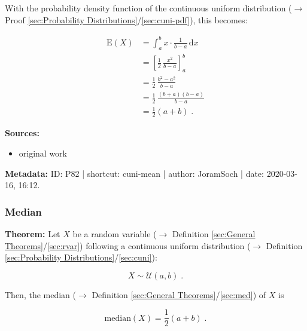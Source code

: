 \documentclass[a4paper,12pt,twoside]{book}
\begin{document}
With the probability density function of the continuous uniform distribution ($\rightarrow$ Proof \ref{sec:Probability Distributions}/\ref{sec:cuni-pdf}), this becomes:

\begin{equation} \label{eq:cuni-mean-cuni-mean-qed}
\begin{split}
\mathrm{E}(X) &= \int_a^b x \cdot \frac{1}{b-a} \, \mathrm{d}x \\
&= \left[ \frac{1}{2} \, \frac{x^2}{b-a} \right]_a^b \\
&= \frac{1}{2} \, \frac{b^2 - a^2}{b-a} \\
&= \frac{1}{2} \, \frac{(b+a)(b-a)}{b-a} \\
&= \frac{1}{2} (a+b) \; .
\end{split}
\end{equation}


\vspace{1em}
\textbf{Sources:}
\begin{itemize}
\item original work\end{itemize}


\vspace{1em}
\textbf{Metadata:} ID: P82 | shortcut: cuni-mean | author: JoramSoch | date: 2020-03-16, 16:12.
\vspace{1em}



\subsubsection[\textbf{Median}]{Median} \label{sec:cuni-med}
\setcounter{equation}{0}

\textbf{Theorem:} Let $X$ be a random variable ($\rightarrow$ Definition \ref{sec:General Theorems}/\ref{sec:rvar}) following a continuous uniform distribution ($\rightarrow$ Definition \ref{sec:Probability Distributions}/\ref{sec:cuni}):

\begin{equation} \label{eq:cuni-med-cuni}
X \sim \mathcal{U}(a, b) \; .
\end{equation}

Then, the median ($\rightarrow$ Definition \ref{sec:General Theorems}/\ref{sec:med}) of $X$ is

\begin{equation} \label{eq:cuni-med-cuni-med}
\mathrm{median}(X) = \frac{1}{2} (a+b) \; .
\end{equation}
\end{document}
